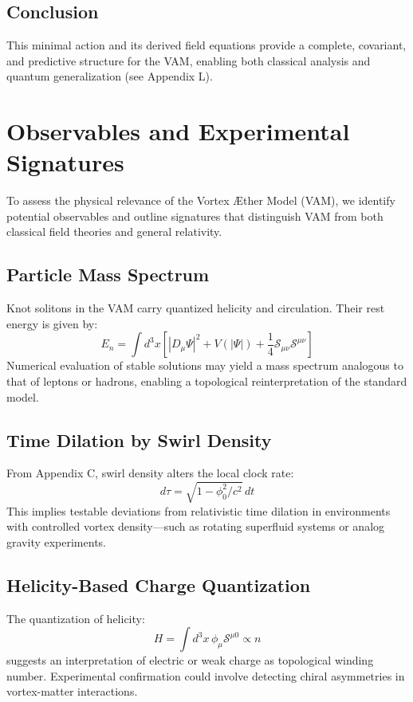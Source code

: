 \subsection{Conclusion}
This minimal action and its derived field equations provide a complete, covariant, and predictive structure for the VAM, enabling both classical analysis and quantum generalization (see Appendix L).

\section{Observables and Experimental Signatures}
To assess the physical relevance of the Vortex Æther Model (VAM), we identify potential observables and outline signatures that distinguish VAM from both classical field theories and general relativity.

\subsection{Particle Mass Spectrum}
Knot solitons in the VAM carry quantized helicity and circulation. Their rest energy is given by:
\begin{equation}
    E_n = \int d^3x \left[ |D_\mu \Psi|^2 + V(|\Psi|) + \frac{1}{4} \mathcal{S}_{\mu\nu} \mathcal{S}^{\mu\nu} \right]
\end{equation}
Numerical evaluation of stable solutions may yield a mass spectrum analogous to that of leptons or hadrons, enabling a topological reinterpretation of the standard model.

\subsection{Time Dilation by Swirl Density}
From Appendix C, swirl density alters the local clock rate:
\begin{equation}
    d\tau = \sqrt{1 - \phi_0^2 / c^2} \, dt
\end{equation}
This implies testable deviations from relativistic time dilation in environments with controlled vortex density—such as rotating superfluid systems or analog gravity experiments.

\subsection{Helicity-Based Charge Quantization}
The quantization of helicity:
\begin{equation}
    H = \int d^3x \, \phi_\mu \mathcal{S}^{\mu0} \propto n
\end{equation}
suggests an interpretation of electric or weak charge as topological winding number. Experimental confirmation could involve detecting chiral asymmetries in vortex-matter interactions.

